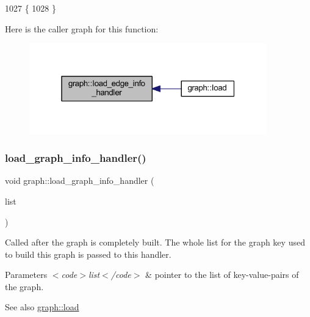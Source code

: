 \begin{DoxyCode}
1027                                                        \{
1028 \}
\end{DoxyCode}
Here is the caller graph for this function\+:\nopagebreak
\begin{figure}[H]
\begin{center}
\leavevmode
\includegraphics[width=292pt]{classgraph_ad049a2f8c191a7dc359e684ef56304d1_icgraph}
\end{center}
\end{figure}
\mbox{\label{classgraph_aaca9ede8005388fd22b56e12280bf1bf}} 
\subsubsection{\texorpdfstring{load\+\_\+graph\+\_\+info\+\_\+handler()}{load\_graph\_info\_handler()}}
{\footnotesize\ttfamily void graph\+::load\+\_\+graph\+\_\+info\+\_\+handler (\begin{DoxyParamCaption}\item[{\mbox{\hyperlink{struct_g_m_l__pair}{G\+M\+L\+\_\+pair}} $\ast$}]{list }\end{DoxyParamCaption})\hspace{0.3cm}{\ttfamily [virtual]}}

Called after the graph is completely built. The whole list for the graph key used to build this graph is passed to this handler.


\begin{DoxyParams}{Parameters}
{\em $<$code$>$list$<$/code$>$} & pointer to the list of key-\/value-\/pairs of the graph. \\
\hline
\end{DoxyParams}
\begin{DoxySeeAlso}{See also}
\mbox{\hyperlink{classgraph_ac28cb3468623a480709d3329033d4ec8}{graph\+::load}} 
\end{DoxySeeAlso}


